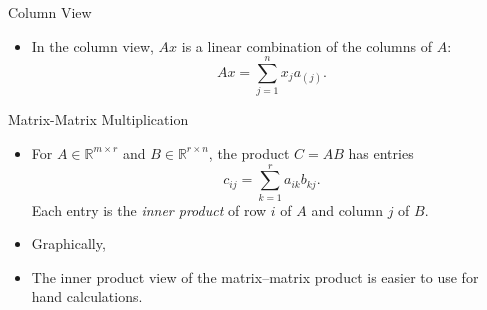 \documentclass[10pt]{beamer}
\begin{document}

\begin{frame}{Column View}

\begin{itemize}
\item In the column view, $Ax$ is a linear combination
of the columns of $A$:
\[
    Ax = \sum_{j=1}^n x_j a_{(j)}.
\]




\vfill




\end{itemize}

\end{frame}

\begin{frame}{Matrix-Matrix Multiplication}
\begin{itemize}
\item For $A\in\mathbb{R}^{m\times r}$ and
$B\in\mathbb{R}^{r\times n}$, the product $C=AB$
has entries
\[
    c_{ij}=\sum_{k=1}^r a_{ik}b_{kj}.
\]
Each entry is the \emph{inner product} of row $i$ of $A$
and column $j$ of $B$.

\item Graphically,

\begin{center}
\end{center}

\item The inner product view of the matrix--matrix product is easier
to use for hand calculations.

\end{itemize}
\end{frame}
\end{document}
